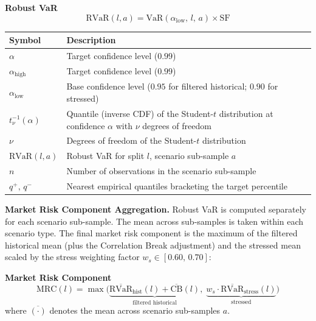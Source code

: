 \documentclass[9pt, a4paper]{extarticle}
\newenvironment{formulabox}{\par\addvspace{4pt}}{\par\addvspace{4pt}}
\newcommand{\vartableheader}{%
    \textbf{Symbol} & \textbf{Description}\\
}
\begin{document}
\begin{formulabox}
\textbf{Robust VaR}
\begin{equation*}
    \mathrm{RVaR}(l,a) =
        \mathrm{VaR}(\alpha_{\mathrm{low}},\,l,\,a) \times \mathrm{SF}
\end{equation*}
\end{formulabox}

\begin{tabularx}{\linewidth}{lX}
\toprule
\vartableheader
\midrule
$\alpha$                   & Target confidence level ($0.99$) \\
$\alpha_{\mathrm{high}}$   & Target confidence level ($0.99$) \\
$\alpha_{\mathrm{low}}$    & Base confidence level
                             ($0.95$ for filtered historical; $0.90$ for stressed) \\
$t_{\nu}^{-1}(\alpha)$     & Quantile (inverse CDF) of the Student-$t$ distribution
                             at confidence $\alpha$ with $\nu$ degrees of freedom \\
$\nu$                      & Degrees of freedom of the Student-$t$ distribution \\
$\mathrm{RVaR}(l,a)$      & Robust VaR for split $l$, scenario sub-sample $a$ \\
$n$                        & Number of observations in the scenario sub-sample \\
$q^{+},\,q^{-}$           & Nearest empirical quantiles bracketing the target percentile \\
\bottomrule
\end{tabularx}

\medskip
\textbf{Market Risk Component Aggregation.}
Robust VaR is computed separately for each scenario sub-sample. The mean across
sub-samples is taken within each scenario type. The final market risk component
is the maximum of the filtered historical mean (plus the Correlation Break
adjustment) and the stressed mean scaled by the stress weighting factor
$w_s \in [0.60,\,0.70]$:

\begin{formulabox}
\textbf{Market Risk Component}
\begin{equation*}
    \mathrm{MRC}(l) = \max\!\Biggl(
        \underbrace{\overline{\mathrm{RVaR}}_{\mathrm{hist}}(l)
                    + \overline{\mathrm{CB}}(l)}_{\text{filtered historical}},\;
        \underbrace{w_s \cdot
            \overline{\mathrm{RVaR}}_{\mathrm{stress}}(l)}_{\text{stressed}}
    \Biggr)
\end{equation*}
where $\overline{(\cdot)}$ denotes the mean across scenario sub-samples $a$.
\end{formulabox}
\end{document}
